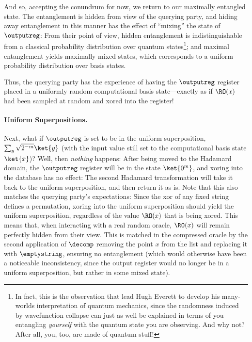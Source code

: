       And so, accepting the conundrum for now, we return to our maximally entangled
        state. The entanglement is hidden from view of the querying party, and
        hiding away entanglement in this manner has the effect of ``mixing''
        the state of $\outputreg$: From their point of view, hidden
        entanglement is indistinguishable from a classical probability
        distribution over quantum states\footnote{
          In fact, this is the observation that lead Hugh Everett to
          develop his many-worlds interpretation of quantum mechanics,
          since the randomness induced by wavefunction collapse can just
          as well be explained in terms of you entangling \emph{yourself} with
          the quantum state you are observing. And why not? After all, you,
          too, are made of quantum stuff!
        }; and maximal entanglement yields
        maximally mixed states, which corresponds to a uniform probability
        distribution over basis states.
        
      Thus, the querying party has the experience of having the
        $\outputreg$ register placed in a uniformly random computational
        basis state---exactly as if $\RO(x)$ had been sampled at random
        and xored into the register!


    \paragraph{Uniform Superpositions.}
      Next, what if $\outputreg$ is set to be in the
        uniform superposition, $\sum_y \sqrt{2^{-m}}\ket{y}$ (with the input
        value still set to the computational basis state $\ket{x}$)? Well, then
        \emph{nothing} happens: After being moved to the Hadamard
        domain, the $\outputreg$ register will be in the state
        $\ket{0^m}$, and xoring into the database has no effect: The second
        Hadamard transformation will take it back to the uniform superposition,
        and then return it as-is. Note that this also matches the querying party's
        expectations: Since the xor of any fixed string defines a permutation, xoring 
        into the uniform superposition should yield the uniform superposition,
        regardless of the value $\RO(x)$ that is being xored.
        This means that, when interacting with a real random oracle, $\RO(x)$
        will remain perfectly hidden from their view. This is matched in the compressed
        oracle by the second application of $\decomp$ removing the point $x$
        from the list and replacing it with $\emptystring$, ensuring no
        entanglement (which would otherwise have been a noticeable
        inconsistency, since the output register would no longer be in a
        uniform superposition, but rather in some mixed state).

